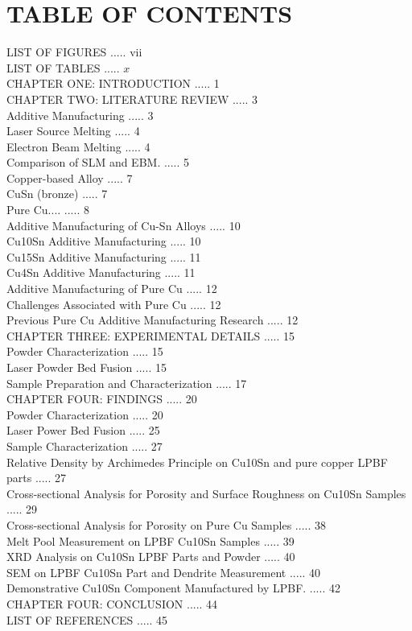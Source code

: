 \documentclass[10pt]{article}
\begin{document}
\section*{TABLE OF CONTENTS}
LIST OF FIGURES ..... vii\\
LIST OF TABLES ..... $x$\\
CHAPTER ONE: INTRODUCTION ..... 1\\
CHAPTER TWO: LITERATURE REVIEW ..... 3\\
Additive Manufacturing ..... 3\\
Laser Source Melting ..... 4\\
Electron Beam Melting ..... 4\\
Comparison of SLM and EBM. ..... 5\\
Copper-based Alloy ..... 7\\
CuSn (bronze) ..... 7\\
Pure $\mathrm{Cu}$.... ..... 8\\
Additive Manufacturing of Cu-Sn Alloys ..... 10\\
Cu10Sn Additive Manufacturing ..... 10\\
Cu15Sn Additive Manufacturing ..... 11\\
Cu4Sn Additive Manufacturing ..... 11\\
Additive Manufacturing of Pure $\mathrm{Cu}$ ..... 12\\
Challenges Associated with Pure $\mathrm{Cu}$ ..... 12\\
Previous Pure Cu Additive Manufacturing Research ..... 12\\
CHAPTER THREE: EXPERIMENTAL DETAILS ..... 15\\
Powder Characterization ..... 15\\
Laser Powder Bed Fusion ..... 15\\
Sample Preparation and Characterization ..... 17\\
CHAPTER FOUR: FINDINGS ..... 20\\
Powder Characterization ..... 20\\
Laser Power Bed Fusion ..... 25\\
Sample Characterization ..... 27\\
Relative Density by Archimedes Principle on Cu10Sn and pure copper LPBF parts ..... 27\\
Cross-sectional Analysis for Porosity and Surface Roughness on Cu10Sn Samples ..... 29\\
Cross-sectional Analysis for Porosity on Pure Cu Samples ..... 38\\
Melt Pool Measurement on LPBF Cu10Sn Samples ..... 39\\
XRD Analysis on Cu10Sn LPBF Parts and Powder ..... 40\\
SEM on LPBF Cu10Sn Part and Dendrite Measurement ..... 40\\
Demonstrative Cu10Sn Component Manufactured by LPBF. ..... 42\\
CHAPTER FOUR: CONCLUSION ..... 44\\
LIST OF REFERENCES ..... 45
\end{document}
